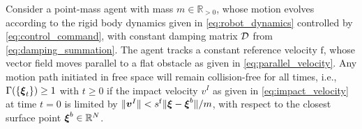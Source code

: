 \begin{lemma} \label{lemma:damping_collision_avoidance}
	Consider a point-mass agent with mass $m \in \mathbb{R}_{>0}$, whose motion evolves according to the rigid body dynamics given in \eqref{eq:robot_dynamics} controlled by \eqref{eq:control_command}, with constant damping matrix $\mathcal{D}$ from \eqref{eq:damping_summation}. The agent tracks a constant reference velocity ${\mathrm{f}}$, whose vector field moves parallel to a flat obstacle as given in \eqref{eq:parallel_velocity}. Any motion path initiated in free space will remain collision-free for all times, i.e., $\Gamma( \{\boldsymbol{\xi}_t\}) \geq 1$ with $t \geq 0$ if the impact velocity $v^I$ as given in \eqref{eq:impact_velocity} at time $t=0$ is limited by $\| \boldsymbol{v}^I\| < s^{\mathrm{f}} \| \boldsymbol{\xi} - \boldsymbol{\xi}^b \| / m$, with respect to the closest surface point $\boldsymbol{\xi}^b \in \mathbb{R}^N$.
\end{lemma}


